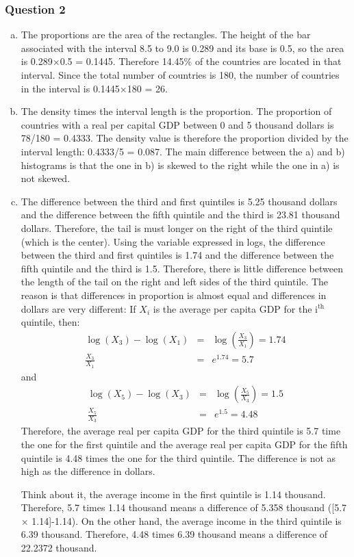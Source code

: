 \documentclass[letterpaper]{article}\usepackage[]{graphicx}\usepackage[]{color}
\numberwithin{exer}{section}
\theoremstyle{nonumberplain}
\begin{document}
\subsubsection*{Question 2}
\begin{enumerate}[a)]
\item The proportions are the area of the rectangles. The height of
  the bar associated with the interval 8.5 to 9.0 is 0.289 and its
  base is 0.5, so the area is 0.289$\times$0.5 = 0.1445. Therefore
  14.45\% of the countries are located in that interval. Since the
  total number of countries is 180, the number of countries in the
  interval is 0.1445$\times$180 = 26.

\item The density times the interval length is the proportion. The
  proportion of countries with a real per capital GDP between 0 and 5
  thousand dollars is 78/180 = 0.4333. The density value is therefore
  the proportion divided by the interval length: 0.4333/5 = 0.087. The
  main difference between the a) and b) histograms is that the one in
  b) is skewed to the right while the one in a) is not skewed.


\item The difference between the third and first quintiles is
  5.25 thousand dollars and the difference between the fifth
  quintile and the third is 23.81 thousand dollars. Therefore,
  the tail is must longer on the right of the third quintile (which is
  the center). Using the variable expressed in logs, the difference
  between the third and first quintiles is 1.74 and the
  difference between the fifth quintile and the third is
  1.5. Therefore, there is little difference between the length
  of the tail on the right and left sides of the third quintile. The
  reason is that differences in proportion is almost equal and
  differences in dollars are very different: If $X_i$ is the average
  per capita GDP for the i$^\mathrm{th}$ quintile, then:
\begin{eqnarray*}
\log(X_3)-\log(X_1) &=& \log\left(\frac{X_3}{X_1}\right) =
1.74\\ \frac{X_3}{X_1} & = & e^{1.74} =
5.7
\end{eqnarray*}
and
\begin{eqnarray*}
\log(X_5)-\log(X_3) &=& \log\left(\frac{X_5}{X_3}\right) =
1.5\\ \frac{X_5}{X_3} & = & e^{1.5} =
4.48
\end{eqnarray*}
Therefore, the average real per capita GDP for the third quintile is
5.7 time the one for the first quintile and the
average real per capita GDP for the fifth quintile is
4.48 times the one for the third quintile. The
difference is not as high as the difference in dollars. 

Think about it, the average income in the first quintile is
1.14 thousand. Therefore, 5.7 times
1.14 thousand means a difference of
5.358 thousand
([5.7 $\times$
  1.14]-1.14). On the other hand, the average
income in the third quintile is 6.39 thousand. Therefore,
4.48 times 6.39 thousand means a
difference of 22.2372 thousand. 

\end{enumerate}
\end{document}

